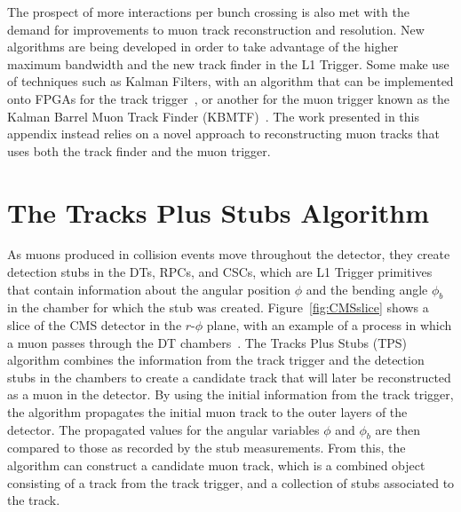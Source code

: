 The prospect of more interactions per bunch crossing is also met with the demand for improvements to muon track reconstruction and resolution.
New algorithms are being developed in order to take advantage of the higher maximum bandwidth and the new track finder in the L1 Trigger.
Some make use of techniques such as Kalman Filters, with an algorithm that can be implemented onto FPGAs for the track trigger~\cite{Amstutz:2194514}, or another for the muon trigger known as the Kalman Barrel Muon Track Finder (KBMTF)~\cite{Bachtis:2648953}.
The work presented in this appendix instead relies on a novel approach to reconstructing muon tracks that uses both the track finder and the muon trigger.

\section{The Tracks Plus Stubs Algorithm}
\label{sec:TPS}

As muons produced in collision events move throughout the detector, they create detection stubs in the DTs, RPCs, and CSCs, which are L1 Trigger primitives that contain information about the angular position $\phi$ and the bending angle $\phi_b$\footnotemark{} in the chamber for which the stub was created.
Figure~\ref{fig:CMSslice} shows a slice of the CMS detector in the $r$-$\phi$ plane, with an example of a process in which a muon passes through the DT chambers~\cite{Barney:2120661}.
The Tracks Plus Stubs (TPS) algorithm combines the information from the track trigger and the detection stubs in the chambers to create a candidate track that will later be reconstructed as a muon in the detector.
By using the initial information from the track trigger, the algorithm propagates the initial muon track to the outer layers of the detector.
The propagated values for the angular variables $\phi$ and $\phi_b$ are then compared to those as recorded by the stub measurements.
From this, the algorithm can construct a candidate muon track, which is a combined object consisting of a track from the track trigger, and a collection of stubs associated to the track.


